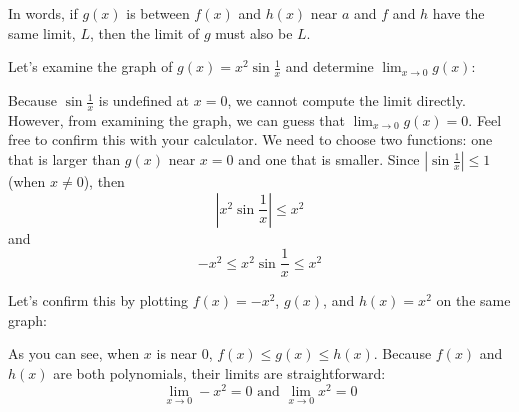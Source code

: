 In words, if $g(x)$ is between $f(x)$ and $h(x)$ near $a$ and $f$ and $h$ have the same limit, $L$, then the limit of $g$ must also be $L$. 

Let's examine the graph of $g(x) = x^2\sin{\frac{1}{x}}$ and determine $\lim_{x \to 0}g(x)$:


Because $\sin{\frac{1}{x}}$ is undefined at $x=0$, we cannot compute the limit directly. However, from examining the graph, we can guess that $\lim_{x \to 0}g(x)=0$. Feel free to confirm this with your calculator. We need to choose two functions: one that is larger than $g(x)$ near $x=0$ and one that is smaller. Since $|\sin{\frac{1}{x}}|\leq 1$ (when $x \neq 0$), then $$|x^2\sin{\frac{1}{x}}|\leq x^2$$ and $$-x^2\leq x^2\sin{\frac{1}{x}} \leq x^2$$

Let's confirm this by plotting $f(x)=-x^2$, $g(x)$, and $h(x)=x^2$ on the same graph:


As you can see, when $x$ is near $0$, $f(x) \leq g(x) \leq h(x)$. Because $f(x)$ and $h(x)$ are both polynomials, their limits are straightforward: $$\lim_{x \to 0}-x^2 = 0 \text{ and } \lim_{x \to 0}x^2 = 0$$


